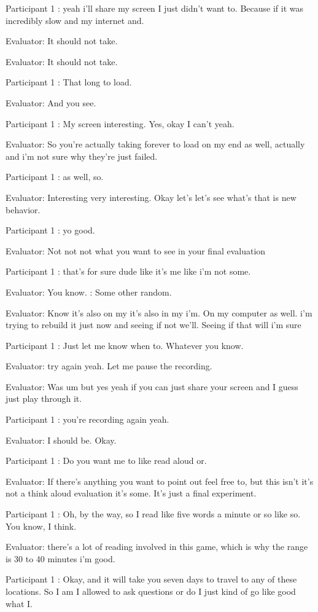 \documentclass{l4proj}
\begin{document}
\begin{appendices}
Participant 1 : yeah i'll share my screen I just didn't want to. Because if it was incredibly slow and my internet and.

Evaluator: It should not take.

Evaluator: It should not take.

Participant 1 : That long to load.

Evaluator: And you see.

Participant 1 : My screen interesting. Yes, okay I can't yeah.

Evaluator: So you're actually taking forever to load on my end as well, actually and i'm not sure why they're just failed.

Participant 1 : as well, so.

Evaluator: Interesting very interesting. Okay let's let's see what's that is new behavior.

Participant 1 : yo good.

Evaluator: Not not not what you want to see in your final evaluation

Participant 1 : that's for sure dude like it's me like i'm not some.

Evaluator: You know. : Some other random.

Evaluator: Know it's also on my it's also in my i'm. On my computer as well. i'm trying to rebuild it just now and seeing if not we'll. Seeing if that will i'm sure

Participant 1 : Just let me know when to. Whatever you know.

Evaluator: try again yeah. Let me pause the recording.

Evaluator: Was um but yes yeah if you can just share your screen and I guess just play through it.

Participant 1 : you're recording again yeah.

Evaluator: I should be. Okay.

Participant 1 : Do you want me to like read aloud or.

Evaluator: If there's anything you want to point out feel free to, but this isn't it's not a think aloud evaluation it's some. It's just a final experiment.

Participant 1 : Oh, by the way, so I read like five words a minute or so like so. You know, I think.

Evaluator: there's a lot of reading involved in this game, which is why the range is 30 to 40 minutes i'm good.

Participant 1 : Okay, and it will take you seven days to travel to any of these locations. So I am I allowed to ask questions or do I just kind of go like good what I.


\end{appendices}
\end{document}
